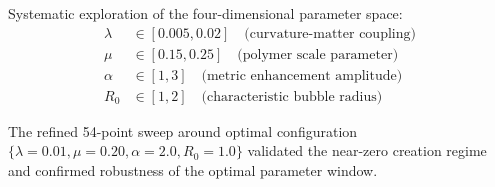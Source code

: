 \documentclass[11pt]{article}
\begin{document}
Systematic exploration of the four-dimensional parameter space:
\begin{align}
\lambda &\in [0.005, 0.02] \quad \text{(curvature-matter coupling)} \\
\mu &\in [0.15, 0.25] \quad \text{(polymer scale parameter)} \\
\alpha &\in [1, 3] \quad \text{(metric enhancement amplitude)} \\
R_0 &\in [1, 2] \quad \text{(characteristic bubble radius)}
\end{align}

The refined 54-point sweep around optimal configuration $\{\lambda=0.01, \mu=0.20, \alpha=2.0, R_0=1.0\}$ validated the near-zero creation regime and confirmed robustness of the optimal parameter window.
\end{document}
